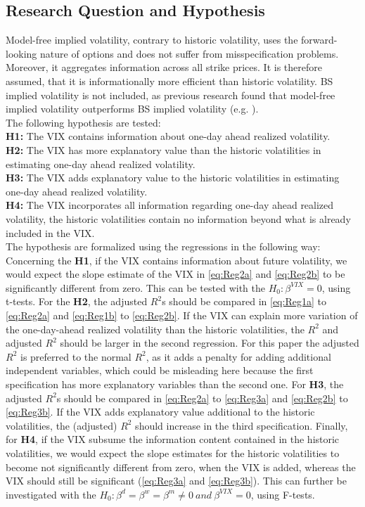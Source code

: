 \subsection{Research Question and Hypothesis}\label{sec:41aHypothesis}
Model-free implied volatility, contrary to historic volatility, uses the forward-looking nature of options and does not suffer from misspecification problems. Moreover, it aggregates information across all strike prices. It is therefore assumed, that it is informationally more efficient than historic volatility. \ac{BS} implied volatility is not included, as previous research found that model-free implied volatility outperforms \ac{BS} implied volatility (e.g. \textcite{jiang2003, bakanova2010}).\\
The following hypothesis are tested:\\
\textbf{\ac{H1}:} The \ac{VIX} contains information about one-day ahead realized volatility.\\
\textbf{\ac{H2}:} The \ac{VIX} has more explanatory value than the historic volatilities in estimating one-day ahead realized volatility.\\
\textbf{\ac{H3}:} The \ac{VIX} adds explanatory value to the historic volatilities in estimating one-day ahead realized volatility.\\
\textbf{\ac{H4}:} The \ac{VIX} incorporates all information regarding one-day ahead realized volatility, the historic volatilities contain no information beyond what is already included in the \ac{VIX}.\\
The hypothesis are formalized using the regressions in the following way:\\
Concerning the \textbf{\ac{H1}}, if the \ac{VIX} contains information about future volatility, we would expect the slope estimate of the VIX in \ref{eq:Reg2a} and \ref{eq:Reg2b} to be significantly different from zero. This can be tested with the $H_{0}: \beta^{VIX} = 0$, using t-tests. For the \textbf{\ac{H2}}, the adjusted $R^{2}$s should be compared in \ref{eq:Reg1a} to \ref{eq:Reg2a} and \ref{eq:Reg1b} to \ref{eq:Reg2b}. If the \ac{VIX} can explain more variation of the one-day-ahead realized volatility than the historic volatilities, the $R^{2}$ and adjusted $R^{2}$ should be larger in the second regression. For this paper the adjusted $R^{2}$ is preferred to the normal $R^{2}$, as it adds a penalty for adding additional independent variables, which could be misleading here because the first specification has more explanatory variables than the second one. For \textbf{\ac{H3}}, the adjusted $R^{2}$s should be compared in \ref{eq:Reg2a} to \ref{eq:Reg3a} and \ref{eq:Reg2b} to \ref{eq:Reg3b}. If the \ac{VIX} adds explanatory value additional to the historic volatilities, the (adjusted) $R^{2}$ should increase in the third specification. Finally, for \textbf{\ac{H4}}, if the VIX subsume the information content contained in the historic volatilities, we would expect the slope estimates for the historic volatilities to become not significantly different from zero, when the VIX is added, whereas the VIX should still be significant (\ref{eq:Reg3a} and \ref{eq:Reg3b}). This can further be investigated with the $H_{0}: \beta^{d} = \beta^{w} = \beta^{m} \neq 0 \ and \ \beta^{VIX} = 0$, using F-tests.

